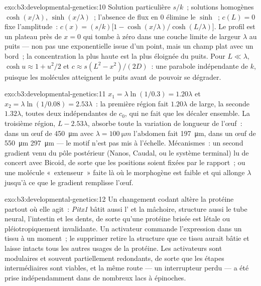 \begin{solution}{exo:b3:developmental-genetics:10}
Solution particulière $s/k$~; solutions homogènes $\cosh(x/\lambda)$,
$\sinh(x/\lambda)$~; l'absence de flux en $0$ élimine le $\sinh$~;
$c(L) = 0$ fixe l'amplitude~:
$c(x) = (s/k)\bigl[1 - \cosh(x/\lambda)/\cosh(L/\lambda)\bigr]$.
Le profil est un plateau près de $x = 0$ qui tombe à zéro dans une
couche limite de largeur $\lambda$ au puits --- non pas une exponentielle
issue d'un point, mais un champ plat avec un bord~; la concentration la
plus haute est la plus éloignée du puits. Pour $L \ll \lambda$,
$\cosh u \approx 1 +
u^{2}/2$ et $c \approx s(L^{2} - x^{2})/(2D)$~: une parabole indépendante
de $k$, puisque les molécules atteignent le puits avant de pouvoir se
dégrader.
\end{solution}

\begin{solution}{exo:b3:developmental-genetics:11}
$x_{1} = \lambda\ln(1/0.3) = 1.20\lambda$ et $x_{2} = \lambda\ln(1/0.08)
= 2.53\lambda$~: la première région fait $1.20\lambda$ de large, la
seconde $1.32\lambda$, toutes deux indépendantes de $c_{0}$, qui ne fait
que les décaler ensemble. La troisième région, $L - 2.53\lambda$, absorbe
toute la variation de longueur de l'œuf~: dans un œuf de
\qty{450}{\micro m} avec $\lambda = \qty{100}{\micro m}$ l'abdomen fait
\qty{197}{\micro m}, dans un œuf de \qty{550}{\micro m}
\qty{297}{\micro m} --- le motif n'est pas mis à l'échelle. Mécanismes~:
un second gradient venu du pôle postérieur (Nanos, Caudal, ou le système
terminal) lu de concert avec Bicoid, de sorte que les positions soient
fixées par le rapport~; ou une molécule «~extenseur~» faite là où le
morphogène est faible et qui allonge $\lambda$ jusqu'à ce que le gradient
remplisse l'œuf.
\end{solution}

\begin{solution}{exo:b3:developmental-genetics:12}
Un changement codant altère la protéine partout où elle agit~:
\emph{Pitx1} bâtit aussi l' et la mâchoire, \emph{} structure aussi le tube neural, l'intestin et les dents, de
sorte qu'une protéine brisée est létale ou pléiotropiquement
invalidante. Un activateur commande l'expression dans un tissu à un
moment~; le supprimer retire la structure que ce tissu aurait bâtie et
laisse intacts tous les autres usages de la protéine. Les activateurs
sont modulaires et souvent partiellement redondants, de sorte que les
étapes intermédiaires sont viables, et la même route --- un
interrupteur perdu --- a été prise indépendamment dans de nombreux lacs
à épinoches.
\end{solution}

